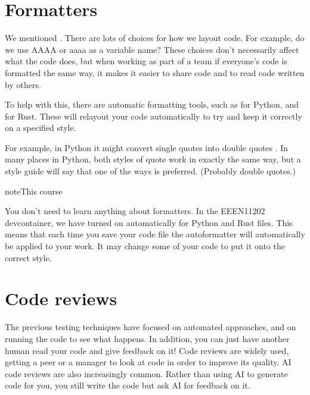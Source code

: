 \documentclass[letterpaper,10pt,british]{sphinxmanual}
\begin{document}
\sphinxstepscope


\section{Formatters}
\label{\detokenize{chapters/software_development_tools/formatters:formatters}}\label{\detokenize{chapters/software_development_tools/formatters::doc}}
\sphinxAtStartPar
We mentioned . There are lots of choices for how we layout code. For example, do we use AAAA or aaaa as a variable name? These choices don’t necessarily affect what the code does, but when working as part of a team if everyone’s code is formatted the same way, it makes it easier to share code and to read code written by others.

\sphinxAtStartPar
To help with this, there are automatic formatting tools, such as  for Python, and   for Rust. These will re\sphinxhyphen{}layout your code automatically to try and keep it correctly on a specified style.

\sphinxAtStartPar
For example, in Python it might convert single quotes  into double quotes . In many places in Python, both styles of quote work in exactly the same way, but a style guide will say that one of the ways is preferred. (Probably double quotes.)

\begin{sphinxadmonition}{note}{This course}

\sphinxAtStartPar
You don’t need to learn anything about formatters. In the EEEN11202 devcontainer, we have turned on  automatically for Python and Rust files. This means that each time you save your code file the auto\sphinxhyphen{}formatter will automatically be applied to your work. It may change some of your code to put it onto the correct style.
\end{sphinxadmonition}

\sphinxstepscope


\section{Code reviews}
\label{\detokenize{chapters/software_development_tools/code_reviews:code-reviews}}\label{\detokenize{chapters/software_development_tools/code_reviews::doc}}
\sphinxAtStartPar
The previous testing techniques have focused on automated approaches, and on running the code to see what happens. In addition, you can just have another human read your code and give feedback on it! Code reviews are widely used, getting a peer or a manager to look at code in order to improve its quality. AI code reviews are also increasingly common. Rather than using AI to generate code for you, you still write the code but ask AI for feedback  on it.
\end{document}
